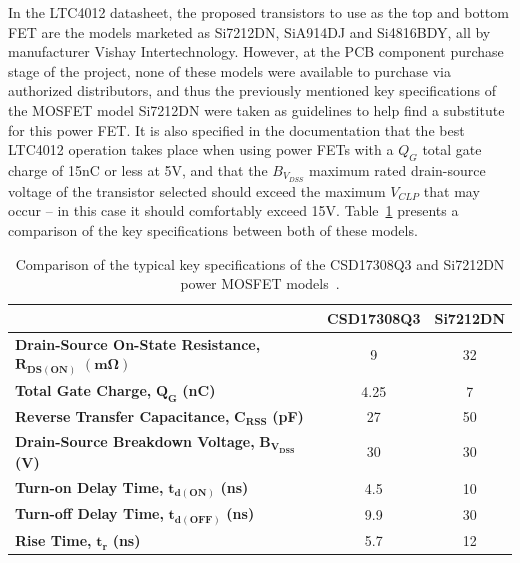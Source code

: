 In the LTC4012 datasheet, the proposed transistors to use as the top and bottom FET are the models marketed as Si7212DN, SiA914DJ and Si4816BDY, all by manufacturer Vishay Intertechnology. However, at the PCB component purchase stage of the project, none of these models were available to purchase via authorized distributors, and thus the previously mentioned key specifications of the MOSFET model Si7212DN were taken as guidelines to help find a substitute for this power FET. It is also specified in the documentation that the best LTC4012 operation takes place when using power FETs with a $Q_G$ total gate charge of 15nC or less at 5V, and that the $B_{V_{DSS}}$ maximum rated drain-source voltage of the transistor selected should exceed the maximum $V_{CLP}$ that may occur -- in this case it should comfortably exceed 15V. Table~\ref{tab:top_FET_comparison} presents a comparison of the key specifications between both of these models.

\begingroup
\begin{table}[h]
	\caption{Comparison of the typical key specifications of the CSD17308Q3 and Si7212DN power MOSFET models~\cite{CSD17308Q3,Si7212DN}.}
	\label{tab:top_FET_comparison}
	\centering%
	\begin{tabular}{lcc}
        \toprule
        {} & \textbf{CSD17308Q3} & \textbf{Si7212DN} \\
        \midrule
        \textbf{Drain-Source On-State Resistance,} $\mathbf{R_{DS(ON)}}$ $\mathbf{(m\Omega)}$ & 9 & 32 \\
		\midrule
		\textbf{Total Gate Charge,} $\mathbf{Q_G}$ \textbf{(nC)} & 4.25 & 7 \\
		\midrule
		\textbf{Reverse Transfer Capacitance,} $\mathbf{C_{RSS}}$ \textbf{(pF)} & 27 & 50 \\
		\midrule
		\textbf{Drain-Source Breakdown Voltage,} $\mathbf{B_{V_{DSS}}}$ \textbf{(V)} & 30 & 30 \\
		\midrule
		\textbf{Turn-on Delay Time,} $\mathbf{t_{d(ON)}}$ \textbf{(ns)} & 4.5 & 10 \\
		\textbf{Turn-off Delay Time,} $\mathbf{t_{d(OFF)}}$ \textbf{(ns)} & 9.9 & 30 \\
		\textbf{Rise Time,} $\mathbf{t_r}$ \textbf{(ns)} & 5.7 & 12 \\
        \bottomrule
    \end{tabular}
\end{table}
\endgroup

